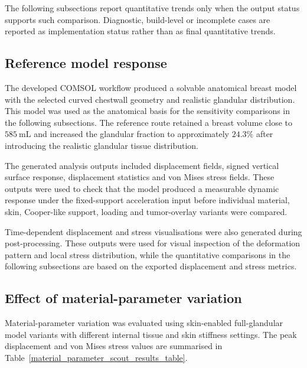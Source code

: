 The following subsections report quantitative trends only when the output status supports such comparison. Diagnostic, build-level or incomplete cases are reported as implementation status rather than as final quantitative trends.


\subsection{Reference model response}
\label{reference_model_response}

The developed COMSOL workflow produced a solvable anatomical breast model with the selected curved chestwall geometry and realistic glandular distribution. This model was used as the anatomical basis for the sensitivity comparisons in the following subsections. The reference route retained a breast volume close to $585~\mathrm{mL}$ and increased the glandular fraction to approximately $24.3\%$ after introducing the realistic glandular tissue distribution.

The generated analysis outputs included displacement fields, signed vertical surface response, displacement statistics and von Mises stress fields. These outputs were used to check that the model produced a measurable dynamic response under the fixed-support acceleration input before individual material, skin, Cooper-like support, loading and tumor-overlay variants were compared.

Time-dependent displacement and stress visualisations were also generated during post-processing. These outputs were used for visual inspection of the deformation pattern and local stress distribution, while the quantitative comparisons in the following subsections are based on the exported displacement and stress metrics.



\subsection{Effect of material-parameter variation}
\label{material_parameter_sensitivity_results}

Material-parameter variation was evaluated using skin-enabled full-glandular model variants with different internal tissue and skin stiffness settings. The peak displacement and von Mises stress values are summarised in Table~\ref{material_parameter_scout_results_table}.


